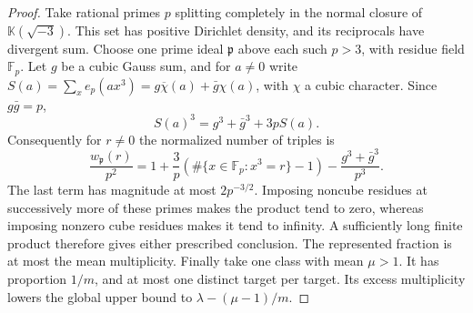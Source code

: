 \documentclass[11pt,letterpaper]{article}
\theoremstyle{definition}
\numberwithin{equation}{section}
\begin{document}
\begin{proof}
Take rational primes $p$ splitting completely in the normal closure of
$\mathbb K(\sqrt{-3})$. This set has positive Dirichlet density, and its
reciprocals have divergent sum. Choose one prime ideal $\mathfrak p$ above each such
$p>3$, with residue field $\mathbb F_p$. Let $g$ be a cubic Gauss sum,
and for $a\ne0$ write $S(a)=\sum_x e_p(ax^3)=
g\overline\chi(a)+\bar g\chi(a)$, with $\chi$ a cubic character.
Since $g\bar g=p$,
\[
                  S(a)^3=g^3+\bar g^3+3p S(a).
\]
Consequently for $r\ne0$ the normalized number of triples is
\[
 \frac{w_{\mathfrak p}(r)}{p^2}
  =1+\frac{3}{p}(\#\{x\in\mathbb F_p:x^3=r\}-1)
            -\frac{g^3+\bar g^3}{p^3}.
\]
The last term has magnitude
at most $2p^{-3/2}$. Imposing noncube residues at successively more
of these primes makes the product tend to zero, whereas imposing
nonzero cube residues makes it tend to infinity. A sufficiently long
finite product therefore gives either prescribed conclusion.
The represented fraction is at most the mean multiplicity. Finally
take one class with mean $\mu>1$. It has proportion $1/m$, and at most
one distinct target per target. Its excess multiplicity lowers the
global upper bound to $\lambda-(\mu-1)/m$.
\end{proof}
\end{document}
